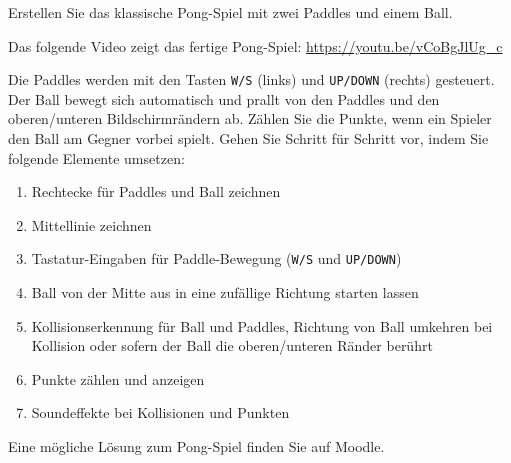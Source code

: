 \begin{myexercise}
    Erstellen Sie das klassische Pong-Spiel mit zwei Paddles und einem Ball.

    Das folgende Video zeigt das fertige Pong-Spiel: \url{https://youtu.be/vCoBgJlUg_c}

    Die Paddles werden mit den Tasten \lstinline|W/S| (links) und \lstinline|UP/DOWN| (rechts) gesteuert. Der Ball bewegt sich automatisch und prallt von den Paddles und den oberen/unteren Bildschirmrändern ab. Zählen Sie die Punkte, wenn ein Spieler den Ball am Gegner vorbei spielt. Gehen Sie Schritt für Schritt vor, indem Sie folgende Elemente umsetzen:
    \begin{enumerate}
        \item Rechtecke für Paddles und Ball zeichnen
        \item Mittellinie zeichnen
        \item Tastatur-Eingaben für Paddle-Bewegung (\texttt{W/S} und \texttt{UP/DOWN})
        \item Ball von der Mitte aus in eine zufällige Richtung starten lassen
        \item Kollisionserkennung für Ball und Paddles, Richtung von Ball umkehren bei Kollision oder sofern der Ball die oberen/unteren Ränder berührt
        \item Punkte zählen und anzeigen
        \item Soundeffekte bei Kollisionen und Punkten
    \end{enumerate}
    \begin{myanswer}
        Eine mögliche Lösung zum Pong-Spiel finden Sie auf Moodle.
    \end{myanswer}
\end{myexercise}


